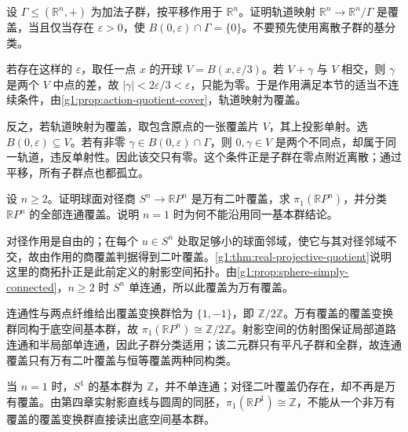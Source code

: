 \begin{exercise}\label{g1:ex:translation-subgroup-discrete}
	设 \(\Gamma\le(\mathbb R^n,+)\) 为加法子群，按平移作用于 \(\mathbb R^n\)。证明轨道映射 \(\mathbb R^n\rightarrow\mathbb R^n/\Gamma\) 是覆盖，当且仅当存在 \(\varepsilon>0\)，使 \(B(0,\varepsilon)\cap\Gamma=\{0\}\)。不要预先使用离散子群的基分类。
\end{exercise}
\begin{solution}
	若存在这样的 \(\varepsilon\)，取任一点 \(x\) 的开球 \(V=B(x,\varepsilon/3)\)。若 \(V+\gamma\) 与 \(V\) 相交，则 \(\gamma\) 是两个 \(V\) 中点的差，故 \(|\gamma|<2\varepsilon/3<\varepsilon\)，只能为零。于是作用满足本节的适当不连续条件，由\cref{g1:prop:action-quotient-cover}，轨道映射为覆盖。

	反之，若轨道映射为覆盖，取包含原点的一张覆盖片 \(V\)，其上投影单射。选 \(B(0,\varepsilon)\subseteq V\)。若有非零 \(\gamma\in B(0,\varepsilon)\cap\Gamma\)，则 \(0,\gamma\in V\) 是两个不同点，却属于同一轨道，违反单射性。因此该交只有零。这个条件正是子群在零点附近离散；通过平移，所有子群点也都孤立。
\end{solution}

\begin{exercise}\label{g1:ex:projective-double-cover}
	设 \(n\ge2\)。证明球面对径商 \(S^n\rightarrow\mathbb RP^n\) 是万有二叶覆盖，求 \(\pi_1(\mathbb RP^n)\)，并分类 \(\mathbb RP^n\) 的全部连通覆盖。说明 \(n=1\) 时为何不能沿用同一基本群结论。
\end{exercise}
\begin{solution}
	对径作用是自由的；在每个 \(u\in S^n\) 处取足够小的球面邻域，使它与其对径邻域不交，故由作用的商覆盖判据得到二叶覆盖。\cref{g1:thm:real-projective-quotient}说明这里的商拓扑正是此前定义的射影空间拓扑。由\cref{g1:prop:sphere-simply-connected}，\(n\ge2\) 时 \(S^n\) 单连通，所以此覆盖为万有覆盖。

	连通性与两点纤维给出覆盖变换群恰为 \(\{1,-1\}\)，即 \(\mathbb Z/2\mathbb Z\)。万有覆盖的覆盖变换群同构于底空间基本群，故 \(\pi_1(\mathbb RP^n)\cong\mathbb Z/2\mathbb Z\)。射影空间的仿射图保证局部道路连通和半局部单连通，因此子群分类适用；该二元群只有平凡子群和全群，故连通覆盖只有万有二叶覆盖与恒等覆盖两种同构类。

	当 \(n=1\) 时，\(S^1\) 的基本群为 \(\mathbb Z\)，并不单连通；对径二叶覆盖仍存在，却不再是万有覆盖。由第四章实射影直线与圆周的同胚，\(\pi_1(\mathbb RP^1)\cong\mathbb Z\)，不能从一个非万有覆盖的覆盖变换群直接读出底空间基本群。
\end{solution}
